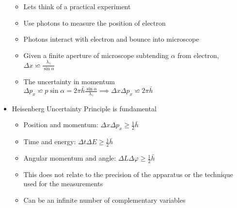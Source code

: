 \documentclass[12pt]{article}
\begin{document}
\begin{itemize}
\begin{itemize}
        \item Lets think of a practical experiment
        \item Use photons to measure the position of electron 
        \item Photons interact with electron and bounce into microscope
        \item Given a finite aperture of microscope subtending $\alpha$ from electron, $\Delta x \backsimeq \frac{\lambda_{\gamma}}{\sin \alpha}$
        \item The uncertainty in momentum $\Delta p_x \backsimeq p \sin \alpha = 2 \pi \bar{h} \frac{\sin \alpha}{\lambda_{\gamma}} \implies \Delta x \Delta p_x \backsimeq 2 \pi \bar{h}$
    \end{itemize}
    \item Heisenberg Uncertainty Principle is fundamental \begin{itemize}
        \item Position and momentum: $\Delta x \Delta p_x \geq \frac{1}{2} \bar{h}$
        \item Time and energy: $\Delta t \Delta E \geq \frac{1}{2} \bar{h}$
        \item Angular momentum and angle: $\Delta L \Delta \varphi \geq \frac{1}{2} \bar{h}$
        \item This does not relate to the precision of the apparatus or the technique used for the measurements
        \item Can be an infinite number of complementary variables
    \end{itemize}
\end{itemize}
\end{document}
